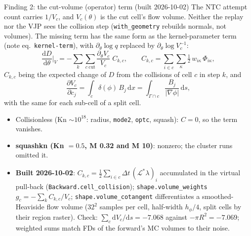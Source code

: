 \documentclass[10pt,aspectratio=169]{beamer}
\newcommand{\dd}{\mathrm{d}}
\newcommand{\code}[1]{\texttt{\small #1}}
\begin{document}
\begin{frame}{Finding 2: the cut-volume (operator) term (built 2026-10-02)}
\small
The NTC attempt count carries $1/V_c$, and $V_c(\theta)$ is the cut cell's flow volume.
Neither the replay nor the VJP sees the collision step (\code{with\_geometry} rebuilds normals,
not volumes).  The missing term has the same form as the kernel-parameter term (note eq.\ \code{kernel-term}),
with $\partial_\theta\log q$ replaced by $\partial_\theta\log V_c^{-1}$:
\[
\frac{\dd D}{\dd\theta}\Big|_{V} = -\sum_k\sum_{c\ \text{cut}}\frac{\partial_\theta V_c}{V_c}\;
C_{k,c},\qquad
C_{k,c} = \sum_{i\in c}\sum_\kappa \tfrac12\,w_{i\kappa}\,\Phi_{i\kappa},
\]
$C_{k,c}$ being the expected change of $D$ from the collisions of cell $c$ in step $k$, and
\[
\frac{\partial V_c}{\partial c_j} = \int_c \delta(\phi)\,B_j\,\dd x = \int_{\Gamma\cap c}\frac{B_j}{|\nabla\phi|}\,\dd s ,
\]
with the same for each sub-cell of a split cell.
\begin{itemize}
\item Collisionless (Kn $\sim 10^{18}$: radius, \code{mode2}, \code{optc}, squash): $C = 0$, so the term vanishes.
\item \textbf{squashkn (Kn $= 0.5$, M 0.32 and M 10)}: nonzero; the cluster runs omitted it.
\item \textbf{Built 2026-10-02}: $C_{k,c} = \tfrac12\sum_{i\in c}\Delta t\,(\mathcal
  L^*\lambda)_i$ accumulated in the virtual pull-back (\code{Backward.cell\_collision});
  \code{shape.volume\_weights} $g_c = -\sum_k C_{k,c}/V_c$; \code{shape.volume\_cotangent}
  differentiates a smoothed-Heaviside flow volume ($32^2$ samples per cell, half-width $h_\phi/4$,
  split cells by their region raster).  Check: $\sum_c \dd V_c/\dd s = -7.068$ against
  $-\pi R^2 = -7.069$; weighted sums match FDs of the forward's MC volumes to their noise.
\end{itemize}
\end{frame}
\end{document}
